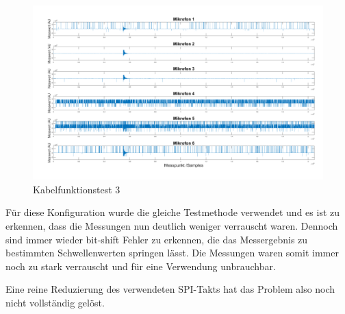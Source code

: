 \begin{figure}[h]
	\begin{center}
		\includegraphics[scale=0.1]{Sections/Tests/Test_2_d}
	\end{center}
	\caption{Kabelfunktionstest 3}
	\label{fig:Test_2_d}
\end{figure}

Für diese Konfiguration wurde die gleiche Testmethode verwendet und es ist zu erkennen, dass die Messungen nun deutlich weniger verrauscht waren. Dennoch sind immer wieder bit-shift Fehler zu erkennen, die das Messergebnis zu bestimmten Schwellenwerten springen lässt. Die Messungen waren somit immer noch zu stark verrauscht und für eine Verwendung unbrauchbar. 

Eine reine Reduzierung des verwendeten SPI-Takts hat das Problem also noch nicht vollständig gelöst.

